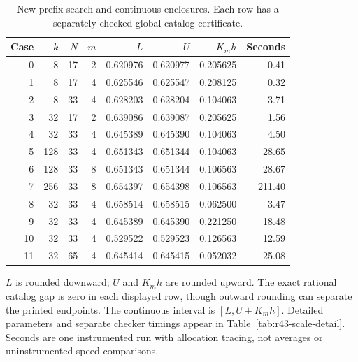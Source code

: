 \begin{table}[p]\centering\small
\caption{New prefix search and continuous enclosures. Each row has a separately checked global catalog certificate.}\label{tab:r43-bounds}
\begin{tabular}{rrrrrrrr}\toprule
Case & $k$ & $N$ & $m$ & $L$ & $U$ & $K_mh$ & Seconds\\\midrule
0 & 8 & 17 & 2 & 0.620976 & 0.620977 & 0.205625 & 0.41 \\
1 & 8 & 17 & 4 & 0.625546 & 0.625547 & 0.208125 & 0.32 \\
2 & 8 & 33 & 4 & 0.628203 & 0.628204 & 0.104063 & 3.71 \\
3 & 32 & 17 & 2 & 0.639086 & 0.639087 & 0.205625 & 1.56 \\
4 & 32 & 33 & 4 & 0.645389 & 0.645390 & 0.104063 & 4.50 \\
5 & 128 & 33 & 4 & 0.651343 & 0.651344 & 0.104063 & 28.65 \\
6 & 128 & 33 & 8 & 0.651343 & 0.651344 & 0.106563 & 28.67 \\
7 & 256 & 33 & 8 & 0.654397 & 0.654398 & 0.106563 & 211.40 \\
8 & 32 & 33 & 4 & 0.658514 & 0.658515 & 0.062500 & 3.47 \\
9 & 32 & 33 & 4 & 0.645389 & 0.645390 & 0.221250 & 18.48 \\
10 & 32 & 33 & 4 & 0.529522 & 0.529523 & 0.126563 & 12.59 \\
11 & 32 & 65 & 4 & 0.645414 & 0.645415 & 0.052032 & 25.08 \\
\bottomrule\end{tabular}
\par\smallskip\begin{minipage}{\textwidth}\small
$L$ is rounded downward; $U$ and $K_mh$ are rounded upward. The exact rational catalog gap is zero in each displayed row, though outward rounding can separate the printed endpoints. The continuous interval is $[L,U+K_mh]$. Detailed parameters and separate checker timings appear in Table~\ref{tab:r43-scale-detail}. Seconds are one instrumented run with allocation tracing, not averages or uninstrumented speed comparisons.
\end{minipage}\end{table}
